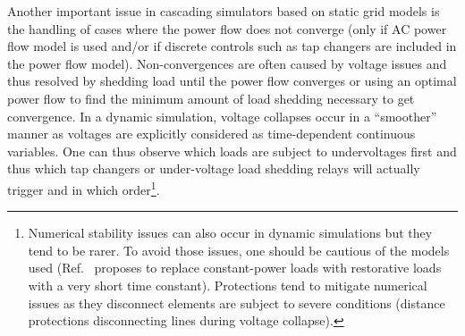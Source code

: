 Another important issue in cascading simulators based on static grid models is the handling of cases where the power flow does not converge (only if AC power flow model is used and/or if discrete controls such as tap changers are included in the power flow model). Non-convergences are often caused by voltage issues and thus resolved by shedding load until the power flow converges or using an optimal power flow to find the minimum amount of load shedding necessary to get convergence. In a dynamic simulation, voltage collapses occur in a ``smoother'' manner as voltages are explicitly considered as time-dependent continuous variables. One can thus observe \eg which loads are subject to undervoltages first and thus which tap changers or under-voltage load shedding relays will actually trigger and in which order\footnote{Numerical stability issues can also occur in dynamic simulations but they tend to be rarer. To avoid those issues, one should be cautious of the models used (\eg Ref.~\cite[p93-98]{SongThesis} proposes to replace constant-power loads with restorative loads with a very short time constant). Protections tend to mitigate numerical issues as they disconnect elements are subject to severe conditions (\eg distance protections disconnecting lines during voltage collapse).}.



